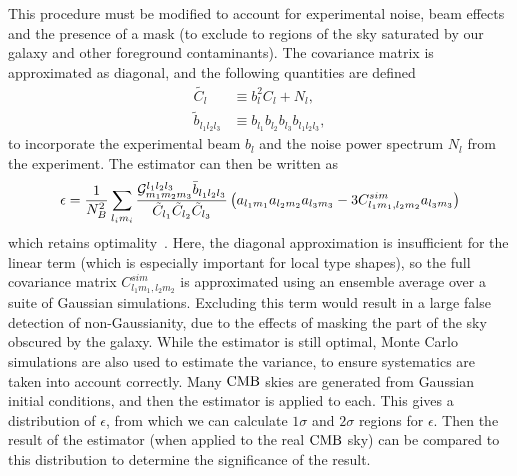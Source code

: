     This procedure must be modified to account for experimental noise, beam effects and
    the presence of a mask (to exclude to regions of the sky saturated by our galaxy
    and other foreground contaminants).
    The covariance matrix is approximated as diagonal, and the
    following quantities are defined
    \begin{align}
           \tilde{C_l} &\equiv b_l^2C_l+N_l,\\
           \tilde{b}_{l_1l_2l_3} &\equiv b_{l_1}b_{l_2}b_{l_3}b_{l_1l_2l_3},
    \end{align}
    to incorporate the experimental beam $b_l$ and the noise power
    spectrum $N_l$ from the experiment.
    The estimator can then be written as~\cite{Creminelli:2005hu, Fergusson_polyspectra, Fergusson_efficient}
    \begin{align}\label{estimator_with_linear}
        \epsilon = \frac{1}{N_B^2}\sum_{l_im_i}
        \frac{\mathcal{G}^{l_1l_2l_3}_{m_1m_2m_3}\bar{b}_{l_1l_2l_3}}{\tilde{C}_{l_1}\tilde{C}_{l_2}\tilde{C}_{l_3}}
        \left(a_{l_1m_1}a_{l_2m_2}a_{l_3m_3}-3C^{sim}_{l_1m_1,l_2m_2}a_{l_3m_3}\right)
    \end{align}
    which retains optimality~\cite{Creminelli:2005hu}.
    Here, the diagonal approximation is insufficient for the linear term
    (which is especially important for local type shapes), so the
    full covariance matrix $C^{sim}_{l_1m_1,l_2m_2}$ is approximated using an ensemble average
    over a suite of Gaussian simulations. Excluding this term would result in a large false
    detection of non-Gaussianity, due to the effects of masking the part of the sky obscured
    by the galaxy. While the estimator is still optimal,
    Monte Carlo simulations are also used to estimate the variance, to ensure systematics
    are taken into account correctly.
    Many $\text{CMB}$ skies are generated from Gaussian initial conditions, and then the estimator
    is applied to each. This gives a distribution of $\epsilon$, from which we can
    calculate $1\sigma$ and $2\sigma$ regions for $\epsilon$. Then the result of the
    estimator (when applied to the real $\text{CMB}$ sky) can be compared to this distribution
    to determine the significance of the result.




